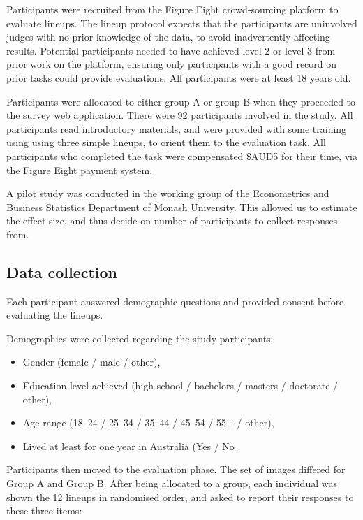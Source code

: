 \documentclass[
doublespace,
  times]{anzsauth}
\providecommand{\tightlist}{%
  \setlength{\itemsep}{0pt}\setlength{\parskip}{0pt}}
\begin{document}
Participants were recruited from the Figure Eight crowd-sourcing
platform \citep{figeight} to evaluate lineups. The lineup protocol
expects that the participants are uninvolved judges with no prior
knowledge of the data, to avoid inadvertently affecting results.
Potential participants needed to have achieved level 2 or level 3 from
prior work on the platform, ensuring only participants with a good
record on prior tasks could provide evaluations. All participants were
at least 18 years old.

Participants were allocated to either group A or group B when they
proceeded to the survey web application. There were 92 participants
involved in the study. All participants read introductory materials, and
were provided with some training using using three simple lineups, to
orient them to the evaluation task. All participants who completed the
task were compensated \$AUD5 for their time, via the Figure Eight
payment system.

A pilot study was conducted in the working group of the Econometrics and
Business Statistics Department of Monash University. This allowed us to
estimate the effect size, and thus decide on number of participants to
collect responses from.

\subsection{Data collection}\label{data-collection}

Each participant answered demographic questions and provided consent
before evaluating the lineups.

Demographics were collected regarding the study participants:

\begin{itemize}
\tightlist
\item
  Gender (female / male / other),
\item
  Education level achieved (high school / bachelors / masters /
  doctorate / other),
\item
  Age range (18--24 / 25--34 / 35--44 / 45--54 / 55+ / other),
\item
  Lived at least for one year in Australia (Yes / No .
\end{itemize}

Participants then moved to the evaluation phase. The set of images
differed for Group A and Group B. After being allocated to a group, each
individual was shown the 12 lineups in randomised order, and asked to
report their responses to these three items:
\end{document}
